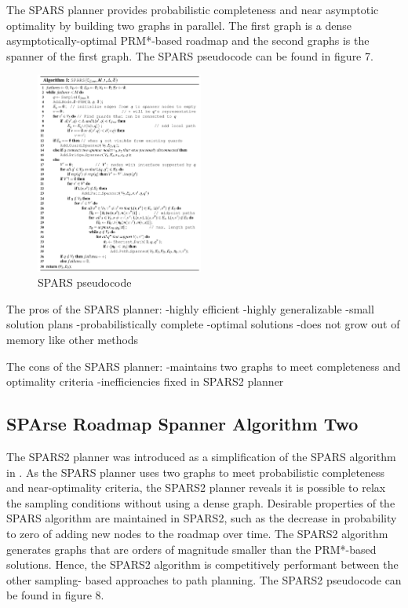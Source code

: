 \documentclass[conference]{IEEEtran} \usepackage[T1]{fontenc} \usepackage[backend=biber, style=ieee]{biblatex}
\begin{document}
The SPARS planner provides probabilistic completeness and near asymptotic optimality by building two graphs in parallel. The first graph is a dense asymptotically-optimal
PRM*-based roadmap and the second graphs is the spanner of the first graph. The SPARS pseudocode can be found in figure 7.

\begin{figure}
\label{figure7} 
\centering 
\includegraphics[width=0.49\textwidth]{spars}
\caption{SPARS pseudocode}
\end{figure}

The pros of the SPARS planner:
-highly efficient
-highly generalizable
-small solution plans
-probabilistically complete
-optimal solutions
-does not grow out of memory like other methods

The cons of the SPARS planner:
-maintains two graphs to meet completeness and optimality criteria
-inefficiencies fixed in SPARS2 planner

\subsection{SPArse Roadmap Spanner Algorithm Two} \label{SPARS2}
The SPARS2 planner was introduced as a simplification of the SPARS algorithm in \cite{spars_two}. As the SPARS planner uses two graphs to meet probabilistic 
completeness and near-optimality criteria, the SPARS2 planner reveals it is possible to relax the sampling conditions without using a dense graph. Desirable properties
of the SPARS algorithm are maintained in SPARS2, such as the decrease in probability to zero of adding new nodes to the roadmap over time. The SPARS2 algorithm
generates graphs that are orders of magnitude smaller than the PRM*-based solutions. Hence, the SPARS2 algorithm is competitively performant between the other sampling-
based approaches to path planning. The SPARS2 pseudocode can be found in figure 8.
\end{document}
